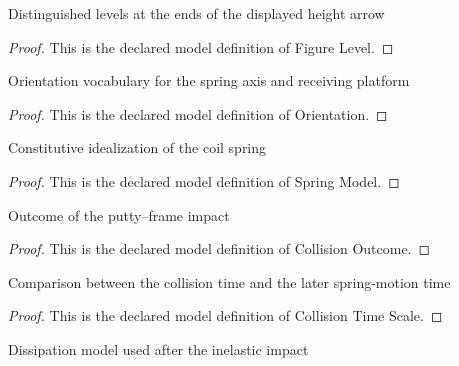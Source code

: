 \begin{definition}
  \label{def:physics:phyx-mini-0765:phyxminiproblems-problemphyxmini0765-figurelevel}
  Distinguished levels at the ends of the displayed height arrow
\end{definition}
\begin{proof}
  This is the declared model definition of Figure Level.
\end{proof}
\begin{definition}[Orientation]
  \label{def:physics:phyx-mini-0765:phyxminiproblems-problemphyxmini0765-orientation}
  Orientation vocabulary for the spring axis and receiving platform
\end{definition}
\begin{proof}
  This is the declared model definition of Orientation.
\end{proof}
\begin{definition}
  \label{def:physics:phyx-mini-0765:phyxminiproblems-problemphyxmini0765-springmodel}
  Constitutive idealization of the coil spring
\end{definition}
\begin{proof}
  This is the declared model definition of Spring Model.
\end{proof}
\begin{definition}
  \label{def:physics:phyx-mini-0765:phyxminiproblems-problemphyxmini0765-collisionoutcome}
  Outcome of the putty--frame impact
\end{definition}
\begin{proof}
  This is the declared model definition of Collision Outcome.
\end{proof}
\begin{definition}
  \label{def:physics:phyx-mini-0765:phyxminiproblems-problemphyxmini0765-collisiontimescale}
  Comparison between the collision time and the later spring-motion time
\end{definition}
\begin{proof}
  This is the declared model definition of Collision Time Scale.
\end{proof}
\begin{definition}
  \label{def:physics:phyx-mini-0765:phyxminiproblems-problemphyxmini0765-postimpactmotionmodel}
  Dissipation model used after the inelastic impact
\end{definition}
